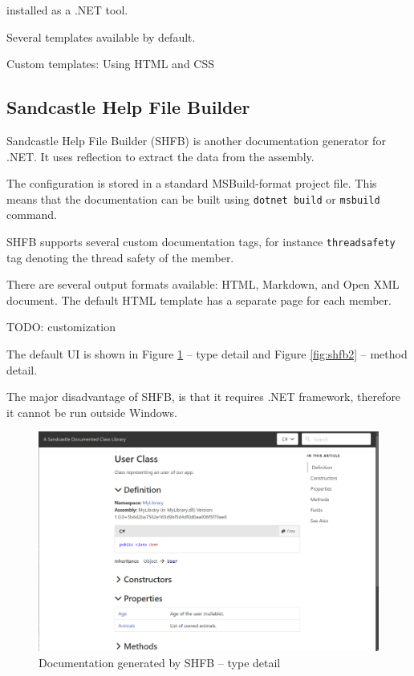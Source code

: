 installed as a .NET tool.

Several templates available by default.

Custom templates: Using HTML and CSS

\subsection{Sandcastle Help File Builder}

Sandcastle Help File Builder (SHFB) is another documentation generator for .NET.
It uses reflection to extract the data from the assembly.

The configuration is stored in a standard MSBuild-format project file.
This means that the documentation can be built using \texttt{dotnet build} or \texttt{msbuild} command.

SHFB supports several custom documentation tags, for instance \texttt{threadsafety} tag denoting the thread safety of the member.

There are several output formats available: HTML, Markdown, and Open XML document.
The default HTML template has a separate page for each member.

TODO: customization

The default UI is shown in Figure \ref{fig:shfb1} -- type detail and Figure \ref{fig:shfb2} -- method detail.

The major disadvantage of SHFB, is that it requires .NET framework, therefore it cannot be run outside Windows.

\begin{figure}
\centering
\includegraphics[width=1\linewidth]{img/sandcastle1.png}
\caption{Documentation generated by SHFB -- type detail}
\label{fig:shfb1}
\end{figure}

